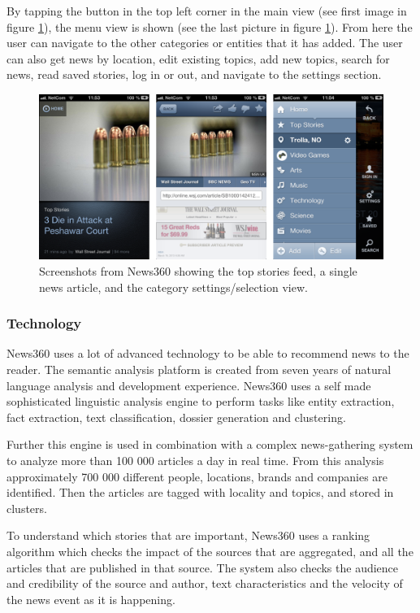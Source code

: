 By tapping the button in the top left corner in the main view (see first image in figure \ref{screenshots_news360}), the menu view is shown (see the last picture in figure \ref{screenshots_news360}). From here the user can navigate to the other categories or entities that it has added. The user can also get news by location, edit existing topics, add new topics, search for news, read saved stories, log in or out, and navigate to the settings section.


\begin{figure}[!htbp]
\centering
\includegraphics[width=130mm]{GFX/screenshots/news360.png}
\caption{Screenshots from News360 showing the top stories feed, a single news article, and the category settings/selection view.}
\label{screenshots_news360}
\end{figure}

\subsubsection{Technology}
News360 uses a lot of advanced technology to be able to recommend news to the reader\cite{news360_technology}. The semantic analysis platform is created from seven years of natural language analysis and development experience. News360 uses a self made sophisticated linguistic analysis engine to perform tasks like entity extraction, fact extraction, text classification, dossier generation and clustering.

Further this engine is used in combination with a complex news-gathering system to analyze more than 100 000 articles a day in real time. From this analysis approximately 700 000 different people, locations, brands and companies are identified. Then the articles are tagged with locality and topics, and stored in clusters.

To understand which stories that are important, News360 uses a ranking algorithm which checks the impact of the sources that are aggregated, and all the articles that are published in that source. The system also checks the audience and credibility of the source and author, text characteristics and the velocity of the news event as it is happening.


